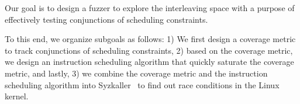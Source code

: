 %
Our goal is to design a fuzzer to explore the interleaving space with
a purpose of effectively testing conjunctions of scheduling
constraints.
%

To this end, we organize subgoals as follows:
%
1) We first design a coverage metric to track conjunctions of
scheduling constraints,
%
2) based on the coverage metric, we design an instruction scheduling
algorithm that quickly saturate the coverage metric, and lastly,
%
3) we combine the coverage metric and the instruction scheduling
algorithm into Syzkaller~\cite{syzkaller} to find out race conditions
in the Linux kernel.



